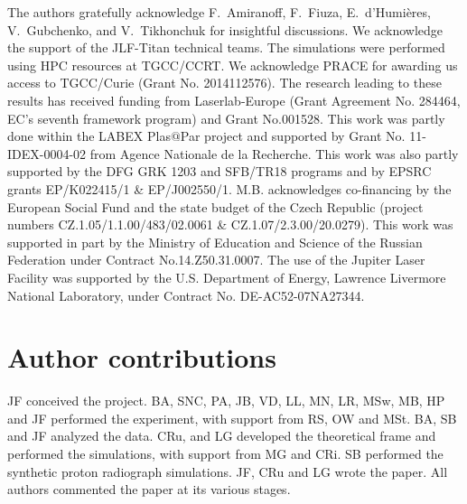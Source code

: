 \documentclass[aps,twocolumn,showpacs,superscriptaddress]{revtex4}
\begin{document}
\begin{acknowledgments}
The authors gratefully acknowledge F.~Amiranoff, F.~Fiuza, E.~d'Humi\`eres, V.~Gubchenko, and V.~Tikhonchuk for insightful discussions.
We acknowledge the support of the JLF-Titan technical teams.
The simulations were performed using HPC resources at TGCC/CCRT. We acknowledge PRACE for awarding us access to TGCC/Curie (Grant No. 2014112576).
The research leading to these results has received funding from Laserlab-Europe (Grant Agreement No. 284464, EC's seventh framework program) and Grant No.001528. 
This work was partly done within the LABEX Plas$@$Par project and supported by Grant No. 11-IDEX-0004-02 from Agence Nationale de la Recherche. 
This work was also partly supported by the DFG GRK 1203 and SFB/TR18 programs and by EPSRC grants EP/K022415/1 \& EP/J002550/1. M.B. acknowledges co-financing by the European Social Fund and the state budget of the Czech Republic (project numbers CZ.1.05/1.1.00/483/02.0061 \& CZ.1.07/2.3.00/20.0279). 
This work was supported in part by the Ministry of Education and Science of the Russian Federation under Contract No.14.Z50.31.0007.
The use of the Jupiter Laser Facility  was supported by the U.S. Department of Energy, Lawrence Livermore  National Laboratory, under Contract No. DE-AC52-07NA27344.
\end{acknowledgments}

\section*{Author contributions}
JF conceived the project. BA, SNC, PA, JB, VD, LL, MN, LR, MSw, MB, HP and JF performed the experiment, with support from RS, OW and MSt.  BA, SB and JF analyzed the data. CRu, and LG developed the theoretical frame and performed the simulations, with support from MG and CRi. SB performed the synthetic proton radiograph simulations. JF, CRu and LG wrote the paper. All authors commented the paper at its various stages.
\end{document}
